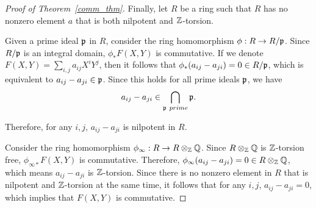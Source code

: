 \begin{proof}[Proof of Theorem~\ref{comm_thm}]
    Finally, let $R$ be a ring such that $R$ has no nonzero element $a$ that is both nilpotent and
    $\mathbb{Z}$-torsion.

    Given a prime ideal $\mathfrak{p}$ in $R$, consider the ring homomorphism $\phi : R \to R / \mathfrak{p}$.
    Since $R / \mathfrak{p}$ is an integral domain, $\phi_* F(X,Y)$ is commutative. If we denote
    $F(X,Y) = \sum_{i, j} a_{ij} X ^ i Y ^ j$, then it follows that
    $\phi_* (a_{ij} - a_{ji}) = 0 \in R / \mathfrak{p}$, which is equivalent to
    $a_{ij} - a_{ji} \in \mathfrak{p}$. Since this holds for all prime ideals $\mathfrak{p}$, we have
    \begin{equation*}
        a_{ij} - a_{ji} \in \bigcap _{\gothp \ prime} \gothp.
    \end{equation*}

    Therefore, for any $i, j$, $a_{ij} - a_{ji}$ is nilpotent in $R$.

    Consider the ring homomorphism $\phi_\infty : R \to R \otimes_{\mathbb{Z}} \mathbb{Q}$. Since
    $R \otimes_{\mathbb{Z}} \mathbb{Q}$ is $\mathbb{Z}$-torsion free, $\phi_{\infty *} F(X,Y)$ is commutative.
    Therefore, $\phi_\infty (a_{ij} - a_{ji}) = 0 \in R \otimes_{\mathbb{Z}} \mathbb{Q}$, which means
    $a_{ij} -a_{ji}$ is $\mathbb{Z}$-torsion. Since there is no nonzero element in $R$ that is
    nilpotent and $\mathbb{Z}$-torsion at the same time, it follows that for any $i, j$,
    $a_{ij} - a_{ji} = 0$, which implies that $F(X,Y)$ is commutative.

\end{proof}